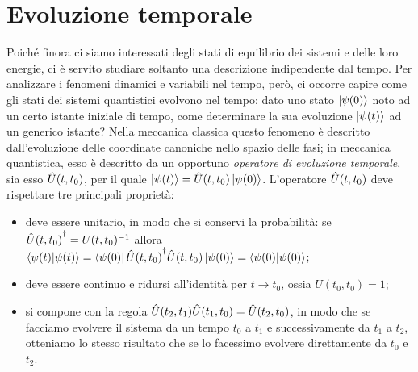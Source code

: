 \chapter{Evoluzione temporale}
Poich\'e finora ci siamo interessati degli stati di equilibrio dei sistemi  e delle loro energie, ci è servito studiare soltanto una descrizione indipendente dal tempo.
Per analizzare i fenomeni dinamici e variabili nel tempo, però, ci occorre capire come gli stati dei sistemi quantistici evolvono nel tempo: dato uno stato $\left|{\psi(0)}\right\rangle$ noto ad un certo istante iniziale di tempo, come determinare la sua evoluzione $\left|{\psi(t)}\right\rangle$ ad un generico istante?
Nella meccanica classica questo fenomeno è descritto dall'evoluzione delle coordinate canoniche nello spazio delle fasi; in meccanica quantistica, esso è descritto da un opportuno \emph{operatore di evoluzione temporale}, sia esso $\hat{U}(t,t_0)$, per il quale $\left|{\psi(t)}\right\rangle=\hat{U}(t,t_0)\left|{\psi(0)}\right\rangle$.
L'operatore $\hat{U}(t,t_0)$ deve rispettare tre principali proprietà:
\begin{itemize}
	\item deve essere unitario, in modo che si conservi la probabilità: se ${\hat{U}(t,t_0)}^\dagger=U(t,t_0)^{-1}$ allora $\left\langle{\psi(t)}\middle|{\psi(t)}\right\rangle=\left\langle{\psi(0)}\right|{\hat{U}(t,t_0)}^\dagger\hat{U}(t,t_0)\left|{\psi(0)}\right\rangle=\left\langle{\psi(0)}\middle|{\psi(0)}\right\rangle$;
	\item deve essere continuo e ridursi all'identità per $t\to t_0$, ossia $U(t_0,t_0)=1$;
	\item si compone con la regola $\hat{U}(t_2,t_1)\hat{U}(t_1,t_0)=\hat{U}(t_2,t_0)$, in modo che se facciamo evolvere il sistema da un tempo $t_0$ a $t_1$ e successivamente da $t_1$ a $t_2$, otteniamo lo stesso risultato che se lo facessimo evolvere direttamente da $t_0$ e $t_2$.
\end{itemize}

